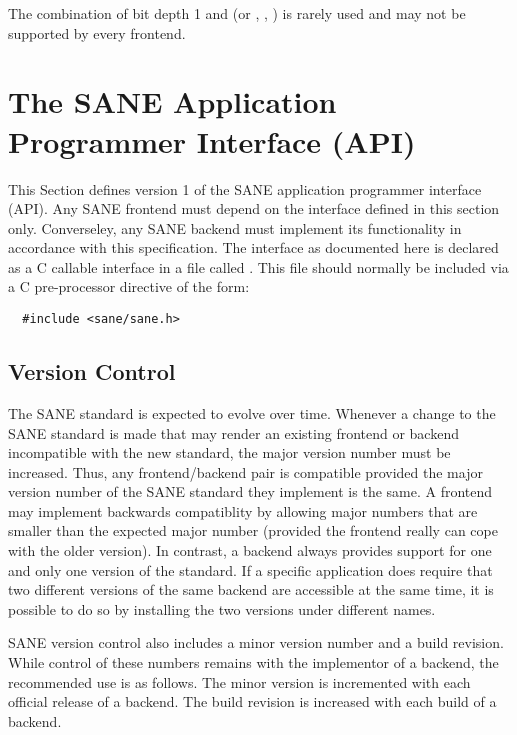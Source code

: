 \documentclass[11pt,DVIps]{report}
\begin{document}
The combination of bit depth 1 and  (or
, , )
is rarely used and may not be supported by every frontend.

\chapter{The SANE Application Programmer Interface (API)}\label{chap:api}

This Section defines version 1 of the SANE application
programmer interface (API).  Any SANE frontend must depend on the
interface defined in this section only.  Converseley, any SANE backend
must implement its functionality in accordance with this
specification.  The interface as documented here is declared as a C
callable interface in a file called .  This file should
normally be included via a C pre-processor directive of the form:
\begin{verbatim}
  #include <sane/sane.h>
\end{verbatim}


\section{Version Control}

The SANE standard is expected to evolve over time.  Whenever a change
to the SANE standard is made that may render an existing frontend or
backend incompatible with the new standard, the major version number
must be increased.  Thus, any frontend/backend pair is compatible
provided the major version number of the SANE standard they implement
is the same.  A frontend may implement backwards compatiblity by
allowing major numbers that are smaller than the expected major number
(provided the frontend really can cope with the older version).  In
contrast, a backend always provides support for one and only one
version of the standard.  If a specific application does require that
two different versions of the same backend are accessible at the same
time, it is possible to do so by installing the two versions under
different names.

SANE version control also includes a minor version number and a build
revision.  While control of these numbers remains with the implementor
of a backend, the recommended use is as follows.  The minor version is
incremented with each official release of a backend.  The build
revision is increased with each build of a backend.
\end{document}
